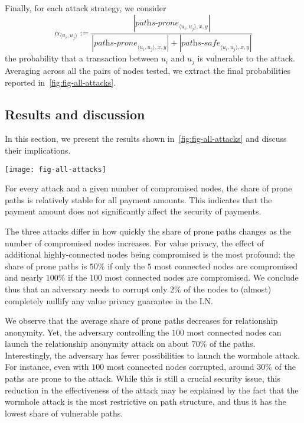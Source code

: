 Finally, for each attack strategy, we consider $$\alpha_{\langle u_i, u_j \rangle} := \frac{|\textit{paths-prone}_{\langle u_i, u_j \rangle, x, y}|}{|\textit{paths-prone}_{\langle u_i, u_j \rangle, x, y}| + |\textit{paths-safe}_{\langle u_i, u_j \rangle, x, y}|}$$ 
the probability that a transaction between $u_i$ and $u_j$ is vulnerable to the attack. 
Averaging across all the pairs of nodes tested, we extract the final probabilities reported in~\cref{fig:fig-all-attacks}.


\subsection{Results and discussion}

In this section, we present the results shown in~\cref{fig:fig-all-attacks} and discuss their implications. 
\begin{figure*}
	\centering
	\texttt{[image: fig-all-attacks]}
	\caption{Share of vulnerable paths for each attack, considering that highest degree nodes are compromised (top), highest capacity nodes are compromised (middle), or random nodes are compromised (bottom).}
	\label{fig:fig-all-attacks}
\end{figure*}

For every attack and a given number of compromised nodes, the share of prone paths is relatively stable for all payment amounts.
This indicates that the payment amount does not significantly affect the security of payments.

The three attacks differ in how quickly the share of prone paths changes as the number of compromised nodes increases.
For value privacy, the effect of additional highly-connected nodes being compromised is the most profound: 
the share of prone paths is $50\%$ if only the $5$ most connected nodes are compromised 
and nearly $100\%$ if the $100$ most connected nodes are compromised. 
We conclude thus that an adversary needs to corrupt only $2\%$ of the nodes to (almost) completely nullify any value privacy guarantee in the LN.

We observe that the average share of prone paths decreases for relationship anonymity.
Yet, the adversary controlling the $100$ most connected nodes can launch the relationship anonymity attack on about $70\%$ of the paths. 
Interestingly, the adversary has fewer possibilities to launch the wormhole attack.
For instance, even with $100$ most connected nodes corrupted, around $30\%$ of the paths are prone to the attack.
While this is still a crucial security issue, this reduction in the effectiveness of the attack 
may be explained by the fact that the wormhole attack is the most restrictive on path structure, and thus it 
has the lowest share of vulnerable paths. 


